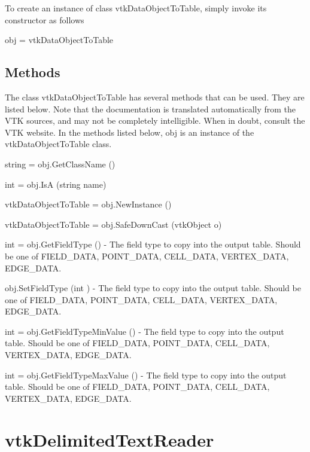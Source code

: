 To create an instance of class vtk\-Data\-Object\-To\-Table, simply invoke its constructor as follows \begin{DoxyVerb}  obj = vtkDataObjectToTable
\end{DoxyVerb}
 \hypertarget{vtkwidgets_vtkxyplotwidget_Methods}{}\subsection{Methods}\label{vtkwidgets_vtkxyplotwidget_Methods}
The class vtk\-Data\-Object\-To\-Table has several methods that can be used. They are listed below. Note that the documentation is translated automatically from the V\-T\-K sources, and may not be completely intelligible. When in doubt, consult the V\-T\-K website. In the methods listed below, {\ttfamily obj} is an instance of the vtk\-Data\-Object\-To\-Table class. 
\begin{DoxyItemize}
\item {\ttfamily string = obj.\-Get\-Class\-Name ()}  
\item {\ttfamily int = obj.\-Is\-A (string name)}  
\item {\ttfamily vtk\-Data\-Object\-To\-Table = obj.\-New\-Instance ()}  
\item {\ttfamily vtk\-Data\-Object\-To\-Table = obj.\-Safe\-Down\-Cast (vtk\-Object o)}  
\item {\ttfamily int = obj.\-Get\-Field\-Type ()} -\/ The field type to copy into the output table. Should be one of F\-I\-E\-L\-D\-\_\-\-D\-A\-T\-A, P\-O\-I\-N\-T\-\_\-\-D\-A\-T\-A, C\-E\-L\-L\-\_\-\-D\-A\-T\-A, V\-E\-R\-T\-E\-X\-\_\-\-D\-A\-T\-A, E\-D\-G\-E\-\_\-\-D\-A\-T\-A.  
\item {\ttfamily obj.\-Set\-Field\-Type (int )} -\/ The field type to copy into the output table. Should be one of F\-I\-E\-L\-D\-\_\-\-D\-A\-T\-A, P\-O\-I\-N\-T\-\_\-\-D\-A\-T\-A, C\-E\-L\-L\-\_\-\-D\-A\-T\-A, V\-E\-R\-T\-E\-X\-\_\-\-D\-A\-T\-A, E\-D\-G\-E\-\_\-\-D\-A\-T\-A.  
\item {\ttfamily int = obj.\-Get\-Field\-Type\-Min\-Value ()} -\/ The field type to copy into the output table. Should be one of F\-I\-E\-L\-D\-\_\-\-D\-A\-T\-A, P\-O\-I\-N\-T\-\_\-\-D\-A\-T\-A, C\-E\-L\-L\-\_\-\-D\-A\-T\-A, V\-E\-R\-T\-E\-X\-\_\-\-D\-A\-T\-A, E\-D\-G\-E\-\_\-\-D\-A\-T\-A.  
\item {\ttfamily int = obj.\-Get\-Field\-Type\-Max\-Value ()} -\/ The field type to copy into the output table. Should be one of F\-I\-E\-L\-D\-\_\-\-D\-A\-T\-A, P\-O\-I\-N\-T\-\_\-\-D\-A\-T\-A, C\-E\-L\-L\-\_\-\-D\-A\-T\-A, V\-E\-R\-T\-E\-X\-\_\-\-D\-A\-T\-A, E\-D\-G\-E\-\_\-\-D\-A\-T\-A.  
\end{DoxyItemize}\hypertarget{vtkinfovis_vtkdelimitedtextreader}{}\section{vtk\-Delimited\-Text\-Reader}\label{vtkinfovis_vtkdelimitedtextreader}
